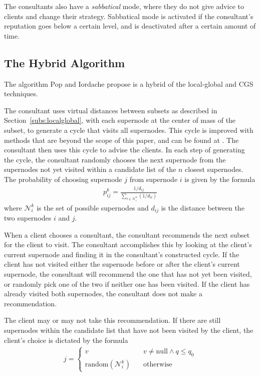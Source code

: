 \documentclass{sig-alternate}
\begin{document}
The consultants also have a \textit{sabbatical} mode, where they do not give advice to clients and change their strategy. Sabbatical mode is activated if the consultant's reputation goes below a certain level, and is deactivated after a certain amount of time. 

\subsection{The Hybrid Algorithm}
\label{subs:pophybrid}
The algorithm Pop and Iordache propose is a hybrid of the local-global and CGS techniques. 

The consultant uses virtual distances between subsets as described in Section~\ref{subs:localglobal}, with each supernode at the center of mass of the subset, to generate a cycle that visits all supernodes. This cycle is improved with methods that are beyond the scope of this paper, and can be found at \cite{Pop:2011}. The consultant then uses this cycle to advise the clients. In each step of generating the cycle, the consultant randomly chooses the next supernode from the supernodes not yet visited within a candidate list of the $n$ closest supernodes. The probability of choosing supernode $j$ from supernode $i$ is given by the formula 
\begin{align*}
p^{k}_{ij}=\frac{1/d_{ij}}{\sum_{l \in \mathcal{N}^{k}_{i}}(1/d_{il})}
\end{align*} 
where $\mathcal{N}^{k}_{i}$ is the set of possible supernodes and $d_{ij}$ is the distance between the two supernodes $i$ and $j$. 

When a client chooses a consultant, the consultant recommends the next subset for the client to visit. The consultant accomplishes this by looking at the client's current supernode and finding it in the consultant's constructed cycle. If the client has not visited either the supernode before or after the client's current supernode, the consultant will recommend the one that has not yet been visited, or randomly pick one of the two if neither one has been visited. If the client has already visited both supernodes, the consultant does not make a recommendation. 

The client may or may not take this recommendation. If there are still supernodes within the candidate list that have not been visited by the client, the client's choice is dictated by the formula
\begin{align*}
j = \left\{
        \begin{array}{ll}
            v & \quad v \neq \textrm{null} \wedge q \leq q_{0} \\
            \textrm{random}\left(\mathcal{N}^{k}_{i}\right) & \quad \textrm{otherwise}
        \end{array}
    \right.
\end{align*}
\end{document}
